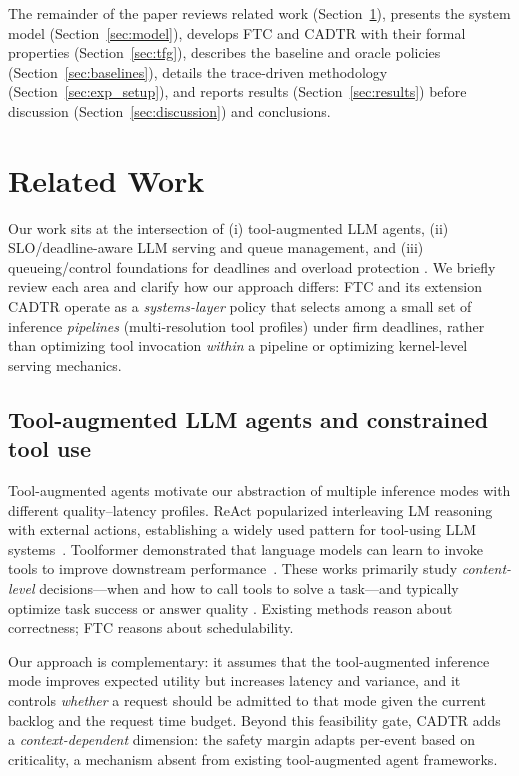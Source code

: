 \documentclass[fleqn,12pt,lineno]{wlpeerj}
\begin{document}
The remainder of the paper reviews related work (Section~\ref{sec:related_work}), presents the system model (Section~\ref{sec:model}), develops FTC and CADTR with their formal properties (Section~\ref{sec:tfg}), describes the baseline and oracle policies (Section~\ref{sec:baselines}), details the trace-driven methodology (Section~\ref{sec:exp_setup}), and reports results (Section~\ref{sec:results}) before discussion (Section~\ref{sec:discussion}) and conclusions.


\section{Related Work}
\label{sec:related_work}

Our work sits at the intersection of (i) tool-augmented LLM agents, (ii) SLO/deadline-aware LLM serving and queue management, and (iii) queueing/control foundations for deadlines and overload protection \cite{nie2024aladdin}. We briefly review each area and clarify how our approach differs: FTC and its extension CADTR operate as a \emph{systems-layer} policy that selects among a small set of inference \emph{pipelines} (multi-resolution tool profiles) under firm deadlines, rather than optimizing tool invocation \emph{within} a pipeline or optimizing kernel-level serving mechanics.

\subsection{Tool-augmented LLM agents and constrained tool use}
Tool-augmented agents motivate our abstraction of multiple inference modes with different quality--latency profiles. ReAct popularized interleaving LM reasoning with external actions, establishing a widely used pattern for tool-using LLM systems~\cite{yao2023react}. Toolformer demonstrated that language models can learn to invoke tools to improve downstream performance~\cite{schick2023toolformer}. These works primarily study \emph{content-level} decisions---when and how to call tools to solve a task---and typically optimize task success or answer quality \cite{pars2025, 258862}. Existing methods reason about correctness; FTC reasons about schedulability.

Our approach is complementary: it assumes that the tool-augmented inference mode improves expected utility but increases latency and variance, and it controls \emph{whether} a request should be admitted to that mode given the current backlog and the request time budget. Beyond this feasibility gate, CADTR adds a \emph{context-dependent} dimension: the safety margin adapts per-event based on criticality, a mechanism absent from existing tool-augmented agent frameworks.
\end{document}

